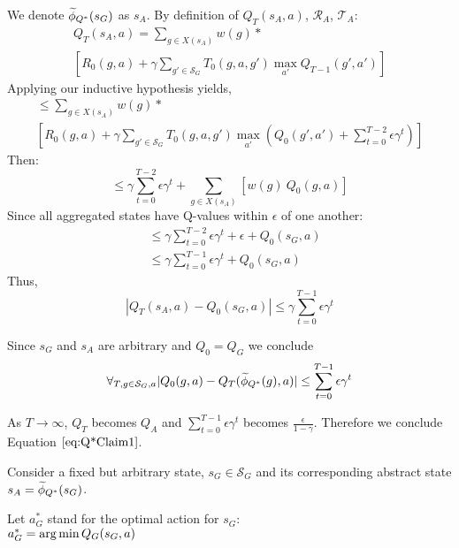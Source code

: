 We denote $\widetilde \phi_{Q^*}(s_G)$ as $s_A$. By definition of $Q_{T}(s_A, a)$, $\mathcal{R}_A$, $\mathcal{T}_A$:
\begin{multline*}
Q_T(s_A, a) = \sum_{g \in X(s_A)}w(g)* \\ 
 \left[ R_0(g,a) + \gamma \sum_{g' \in \mathcal{S}_G} T_0(g,a,g') \max_{a'} Q_{T-1}(g', a')      \right]
\end{multline*}
Applying our inductive hypothesis yields,
\begin{multline*}
\leq \sum_{g \in X(s_A)}w(g) * \\ \left[ R_0(g,a) + \gamma \sum_{g' \in \mathcal{S}_G} T_0(g,a,g') \max_{a'}(Q_0(g', a') + \sum_{t=0}^{T-2} \epsilon \gamma^t)      \right]
\end{multline*}
Then:
\begin{equation*}
\leq \gamma\sum_{t=0}^{T-2} \epsilon \gamma^t + \sum_{g \in X(s_A)}\left[ w(g)\ Q_0(g,a)\right]
\end{equation*}
Since all aggregated states have Q-values within $\epsilon$ of one another:
\begin{align*}
&\leq \gamma\sum_{t=0}^{T-2} \epsilon \gamma^t + \epsilon + Q_0(s_G, a)\\
&\leq \gamma\sum_{t=0}^{T-1} \epsilon \gamma^t + Q_0(s_G, a)
\end{align*}
Thus,
\begin{equation*}
\left| Q_{T}(s_A, a) - Q_0(s_G,a) \right| \leq \gamma\sum_{t=0}^{T-1}\epsilon \gamma^t
\end{equation*}

Since $s_G$ and $s_A$ are arbitrary and $Q_0=Q_G$ we conclude
\begin{equation}
\forall_{T, g \in \mathcal{S}_G, a} |Q_0(g, a) - Q_T(\widetilde \phi_{Q^*}(g), a)| \leq \sum_{t=0}^{T-1} \epsilon \gamma^t
\end{equation}

As $T \rightarrow \infty$, $Q_T$ becomes $Q_A$ and $\sum_{t=0}^{T-1} \epsilon \gamma^t$ becomes $\frac{\epsilon}{1-\gamma}$. Therefore we conclude Equation $\ref{eq:Q*Claim1}$.

Consider a fixed but arbitrary state, $s_G \in \mathcal{S}_G$ and its corresponding abstract state $s_A=\widetilde \phi_{Q^*}(s_G)$.

Let $a^*_G$ stand for the optimal action for $s_G$: \\
$a^*_G = \operatorname*{arg\,min} Q_G(s_G, a)$

